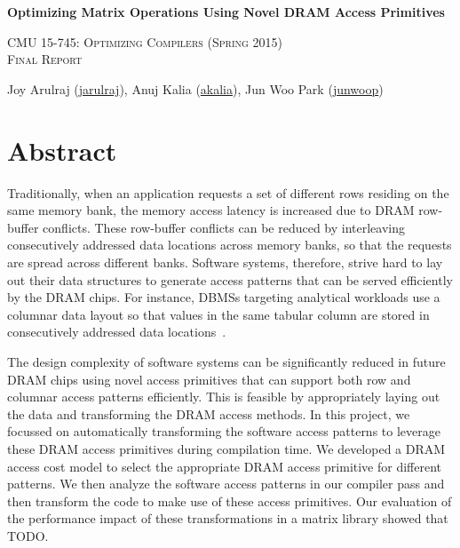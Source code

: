 \documentclass[letterpaper]{article}
\makeatletter
\newcommand{\email}[1]{\href{mailto:#1@cs.cmu.edu}{#1}}
\makeatother
\begin{document}
\section*{}
\begin{center}
  \centerline{\textbf{\Large Optimizing Matrix Operations Using Novel DRAM
  Access Primitives}}
  \vspace{1em}
  \textsc{\large CMU 15-745: Optimizing Compilers (Spring 2015)} \\
  \vspace{1em}
  \textsc{\large Final Report} \\
  \vspace{3em}
  \centerline{\large{Joy Arulraj (\email{jarulraj}), Anuj Kalia
    (\email{akalia})}, Jun Woo Park (\email{junwoop}) }
  \vspace{1em}
\end{center}

\section{Abstract}

Traditionally, when an application requests a set of different rows 
residing on the same memory bank, the memory access latency is 
increased due to DRAM row-buffer conflicts.
These row-buffer conflicts can be reduced by interleaving
consecutively addressed data locations across memory banks, so that
the requests are spread across different banks.
Software systems, therefore, strive hard to lay out their data structures 
to generate access patterns that can be served efficiently by 
the DRAM chips. 
For instance, DBMSs targeting analytical workloads use a columnar data 
layout so that values in the same tabular column are stored in
consecutively addressed data locations~\cite{col1}.

The design complexity of software systems can be significantly 
reduced in future DRAM chips using novel access primitives that can 
support both row and columnar access patterns efficiently. 
This is feasible by appropriately laying out the data and transforming 
the DRAM access methods.
In this project, we focussed on automatically
transforming the software access patterns to leverage these 
DRAM access primitives during compilation time.
We developed a DRAM access cost model to select the appropriate DRAM
access primitive for different patterns. We then
analyze the software access patterns in our compiler pass and then
transform the code to make use of these access primitives. 
Our evaluation of the performance impact of these transformations in 
a matrix library showed that TODO.
\end{document}

